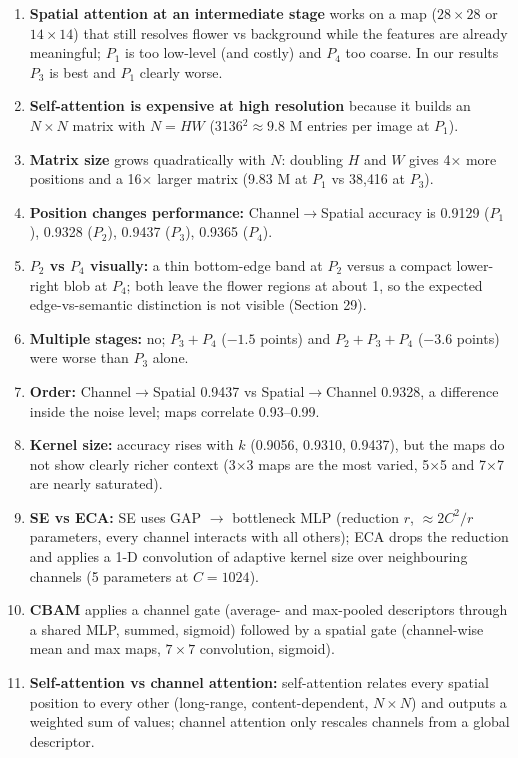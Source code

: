 \documentclass[10pt]{article}
\begin{document}
\begin{enumerate}
\item \textbf{Spatial attention at an intermediate stage} works on a map ($28\times28$ or $14\times14$) that still resolves flower vs background while the features are already meaningful; $P_1$ is too low-level (and costly) and $P_4$ too coarse. In our results $P_3$ is best and $P_1$ clearly worse.
\item \textbf{Self-attention is expensive at high resolution} because it builds an $N\times N$ matrix with $N=HW$ (3136$^2\approx9.8$ M entries per image at $P_1$).
\item \textbf{Matrix size} grows quadratically with $N$: doubling $H$ and $W$ gives 4$\times$ more positions and a 16$\times$ larger matrix (9.83 M at $P_1$ vs 38{,}416 at $P_3$).
\item \textbf{Position changes performance:} Channel$\to$Spatial accuracy is 0.9129 ($P_1$), 0.9328 ($P_2$), 0.9437 ($P_3$), 0.9365 ($P_4$).
\item \textbf{$P_2$ vs $P_4$ visually:} a thin bottom-edge band at $P_2$ versus a compact lower-right blob at $P_4$; both leave the flower regions at about 1, so the expected edge-vs-semantic distinction is not visible (Section 29).
\item \textbf{Multiple stages:} no; $P_3{+}P_4$ ($-1.5$ points) and $P_2{+}P_3{+}P_4$ ($-3.6$ points) were worse than $P_3$ alone.
\item \textbf{Order:} Channel$\to$Spatial 0.9437 vs Spatial$\to$Channel 0.9328, a difference inside the noise level; maps correlate 0.93--0.99.
\item \textbf{Kernel size:} accuracy rises with $k$ (0.9056, 0.9310, 0.9437), but the maps do not show clearly richer context (3$\times$3 maps are the most varied, 5$\times$5 and 7$\times$7 are nearly saturated).
\item \textbf{SE vs ECA:} SE uses GAP $\to$ bottleneck MLP (reduction $r$, $\approx2C^2/r$ parameters, every channel interacts with all others); ECA drops the reduction and applies a 1-D convolution of adaptive kernel size over neighbouring channels (5 parameters at $C=1024$).
\item \textbf{CBAM} applies a channel gate (average- and max-pooled descriptors through a shared MLP, summed, sigmoid) followed by a spatial gate (channel-wise mean and max maps, $7\times7$ convolution, sigmoid).
\item \textbf{Self-attention vs channel attention:} self-attention relates every spatial position to every other (long-range, content-dependent, $N\times N$) and outputs a weighted sum of values; channel attention only rescales channels from a global descriptor.

\end{enumerate}
\end{document}
